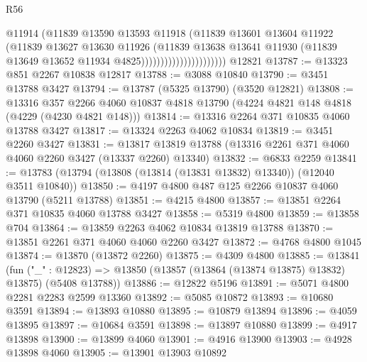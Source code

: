 \begin{lexlean}{R56}
\begin{coremodule}
                                      @11914
                                      (@11839
                                        @13590
                                        @13593
                                        @11918
                                        (@11839
                                          @13601
                                          @13604
                                          @11922
                                          (@11839
                                            @13627
                                            @13630
                                            @11926
                                            (@11839
                                              @13638
                                              @13641
                                              @11930
                                              (@11839
                                                @13649
                                                @13652
                                                @11934
                                                @4825))))))))))))))))))))))
    @12821
@13787 := @13323 @851 @2267 @10838 @12817
@13788 := @3088 @10840
@13790 := @3451 @13788 @3427
@13794 := @13787 (@5325 @13790) (@3520 @12821)
@13808 := @13316
    @357
    @2266
    @4060
    @10837
    @4818
    @13790
    (@4224 @4821 @148 @4818 (@4229 (@4230 @4821 @148)))
@13814 := @13316 @2264 @371 @10835 @4060 @13788 @3427
@13817 := @13324 @2263 @4062 @10834
@13819 := @3451 @2260 @3427
@13831 := @13817 @13819 @13788 (@13316 @2261 @371 @4060 @4060 @2260 @3427 (@13337 @2260) @13340)
@13832 := @6833 @2259
@13841 := @13783 (@13794 (@13808 (@13814 (@13831 @13832) @13340)) (@12040 @3511 @10840))
@13850 := @4197 @4800 @487 @125 @2266 @10837 @4060 @13790 (@5211 @13788)
@13851 := @4215 @4800
@13857 := @13851 @2264 @371 @10835 @4060 @13788 @3427
@13858 := @5319 @4800
@13859 := @13858 @704
@13864 := @13859 @2263 @4062 @10834 @13819 @13788
@13870 := @13851 @2261 @371 @4060 @4060 @2260 @3427
@13872 := @4768 @4800 @1045
@13874 := @13870 (@13872 @2260)
@13875 := @4309 @4800
@13885 := @13841
    (fun ("_" : @12823) => @13850 (@13857 (@13864 (@13874 @13875) @13832) @13875) (@5408 @13788))
@13886 := @12822 @5196
@13891 := @5071 @4800 @2281 @2283 @2599 @13360
@13892 := @5085 @10872
@13893 := @10680 @3591
@13894 := @13893 @10880
@13895 := @10879 @13894
@13896 := @4059 @13895
@13897 := @10684 @3591
@13898 := @13897 @10880
@13899 := @4917 @13898
@13900 := @13899 @4060
@13901 := @4916 @13900
@13903 := @4928 @13898 @4060
@13905 := @13901 @13903 @10892

\end{coremodule}
\end{lexlean}
